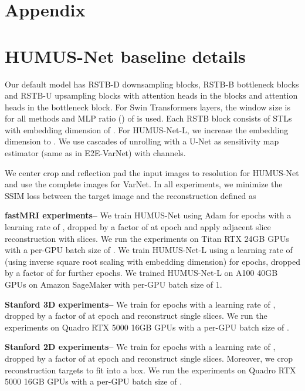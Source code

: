 \section*{Appendix}
\section{HUMUS-Net baseline details \label{sec:apx_bl}}
Our default model has  RSTB-D downsampling blocks,  RSTB-B bottleneck blocks and  RSTB-U upsampling blocks with  attention heads in the  blocks and  attention heads in the bottleneck block. For Swin Transformers layers, the window size is  for all methods and MLP ratio () of  is used. Each RSTB block consists of   STLs with embedding dimension of . For HUMUS-Net-L, we increase the embedding dimension to . We use  cascades of unrolling with a U-Net as sensitivity map estimator (same as in E2E-VarNet) with  channels.

We center crop and  reflection pad the input images to  resolution for HUMUS-Net and use the complete images for VarNet. In all experiments, we minimize the SSIM loss between the target image  and the reconstruction  defined as
 

\textbf{fastMRI experiments--} We train HUMUS-Net using Adam for  epochs with a learning rate of , dropped by a factor of  at epoch  and apply adjacent slice reconstruction with  slices. We run the experiments on  Titan RTX 24GB GPUs with a per-GPU batch size of . We train HUMUS-Net-L using a learning rate of  (using inverse square root scaling with embedding dimension) for  epochs, dropped by a factor of  for further  epochs. We trained HUMUS-Net-L on  A100 40GB GPUs on Amazon SageMaker with per-GPU batch size of 1.

\textbf{Stanford 3D experiments--} We train for  epochs with a learning rate of , dropped by a factor of  at epoch  and reconstruct single slices. We run the experiments on  Quadro RTX 5000 16GB GPUs with a per-GPU batch size of . 

\textbf{Stanford 2D experiments--} We train for  epochs with a learning rate of , dropped by a factor of  at epoch  and reconstruct single slices. Moreover, we crop reconstruction targets to fit into a  box. We run the experiments on  Quadro RTX 5000 16GB GPUs with a per-GPU batch size of . 


